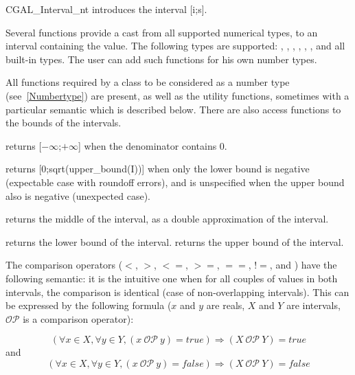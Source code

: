 \begin{ccClass} {CGAL_Interval_nt}
{introduces the interval [i;s].}

Several functions  provide a cast
from all supported numerical types, to an interval 
containing the value.  The following types are supported: ,
, , , ,
, and all built-in types.
The user can add such functions for his own number types.


\ccOperations
{}

All functions required by a class to be considered as a {\cgal} number type
(see~\ref{Numbertype}) are present, as well as the utility functions,
sometimes with a particular semantic which is described below.  There are also
access functions to the bounds of the intervals.


 {returns
[$-\infty$;$+\infty$] when the denominator contains 0.}

 {returns
[0;sqrt(upper\_bound(I))] when only the lower bound is negative (expectable
case with roundoff errors), and is unspecified when the upper bound also is
negative (unexpected case).}

 {returns the
middle of the interval, as a double approximation of the interval.}

 {returns the lower bound of the interval.}
 {returns the upper bound of the interval.}

The comparison operators ($<$, $>$, $<=$, $>=$, $==$, $!=$, 
and ) have the following semantic: it is the intuitive
one when for all couples of values in both intervals, the comparison
is identical (case of non-overlapping intervals).  This can be expressed
by the following formula ($x$ and $y$ are reals, $X$ and $Y$ are
intervals, $\mathcal{OP}$ is a comparison operator):

$$
\left(\forall x \in X, \forall y \in Y, (x\ \mathcal{OP}\ y) = true\right)
\Rightarrow (X\ \mathcal{OP}\ Y) = true
$$
and
$$
\left(\forall x \in X, \forall y \in Y, (x\ \mathcal{OP}\ y) = false\right)
\Rightarrow (X\ \mathcal{OP}\ Y) =false
$$


\end{ccClass}
